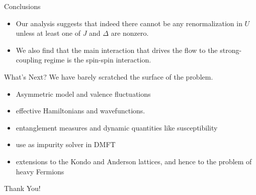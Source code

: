 \documentclass[aspectratio=169]{beamer}
\begin{document}
\begin{frame}{Conclusions}
\begin{itemize} 
	\item Our analysis suggests that indeed there cannot be any renormalization in \(U\) unless at least one of \(J\) and \(\Delta\) are nonzero.
		\vspace{10pt}
	\item We also find that the main interaction that drives the flow to the strong-coupling regime is the spin-spin interaction.
\end{itemize}
\end{frame}

\begin{frame}{What's Next?}
We have barely scratched the surface of the problem.
\vspace{10pt}
\begin{itemize} 
\item Asymmetric model and valence fluctuations
	\vspace{10pt}
\item effective Hamiltonians and wavefunctions.
	\vspace{10pt}
\item entanglement measures and dynamic quantities like susceptibility
	\vspace{10pt}
\item use as impurity solver in DMFT
	\vspace{10pt}
\item extensions to the Kondo and Anderson lattices, and hence to the problem of heavy Fermions
\end{itemize}
\end{frame}
\begin{frame}
	\LARGE \centering Thank You!
\end{frame}
\end{document}
